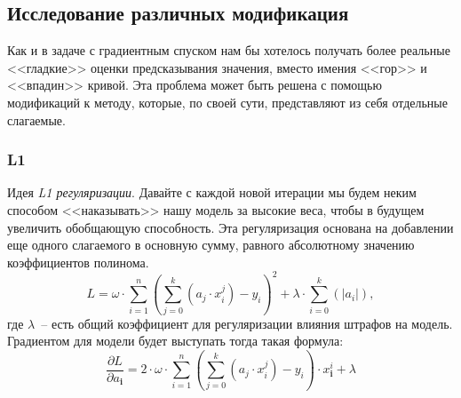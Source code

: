 \documentclass[12pt, a4paper, oneside, final]{article}
\begin{document}
	\subsection*{Исследование различных модификация}
	Как и в задаче с градиентным спуском нам бы хотелось получать более реальные <<гладкие>> оценки предсказывания значения, вместо имения <<гор>> и <<впадин>> кривой.
	Эта проблема может быть решена с помощью модификаций к методу, которые, по своей сути, представляют из себя отдельные слагаемые.
	\subsubsection*{L1}
	Идея \textit{L1 регуляризации}.
	Давайте с каждой новой итерации мы будем неким способом <<наказывать>> нашу модель за высокие веса, чтобы в будущем увеличить обобщающую способность.
	Эта регуляризация основана на добавлении еще одного слагаемого в основную сумму, равного абсолютному значению коэффициентов полинома.
	\[
		L = \omega\cdot\sum\limits_{i = 1}^{n}{\left(\sum\limits_{j = 0}^{k}{\left(a_{j} \cdot x^{j}_{i}\right)} - y_{i}\right)^{2}} + \lambda \cdot \sum\limits_{i = 0}^{k}{\left(|a_{i}|\right)},
	\]
	где $\lambda$~-- есть общий коэффициент для регуляризации влияния штрафов на модель.
	Градиентом для модели будет выступать тогда такая формула:
	\[
		\dfrac{\partial{L}}{\partial{a_{\mathbf{i}}}} = 2\cdot\omega\cdot\sum\limits_{i = 1}^{n}{\left(\sum\limits_{j = 0}^{k}{\left(a_{j} \cdot x_{i}^{j}\right)} - y_{i}\right) \cdot x^{i}_{\mathbf{i}}} + \lambda
	\]
\end{document}
